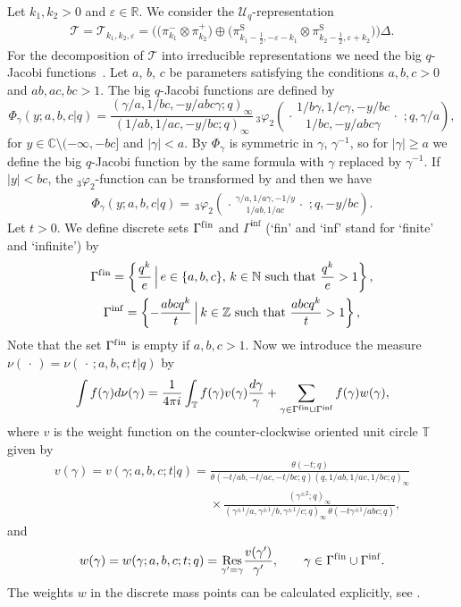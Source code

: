 \documentclass[11pt]{article}
\numberwithin{equation}{section}
\numberwithin{theorem}{section}
\numberwithin{proposition}{section}
\numberwithin{lemma}{section}
\numberwithin{corollary}{section}
\numberwithin{definition}{section}
\numberwithin{example}{section}
\numberwithin{remark}{section}
\numberwithin{note}{section}
\newcommand{\N}{\mathbb N}
\newcommand{\C}{\mathbb C}
\newcommand{\Z}{\mathbb Z}
\newcommand{\T}{\mathbb T}
\newcommand{\eps}{\varepsilon}
\newcommand{\rphis}[5]{\,_{#1}\varphi_{#2} \left( \genfrac{.}{.}{0pt}{}{#3}{#4}
\ ;#5 \right)}
\newcommand{\U}{\mathcal U}
\newcommand{\Res}[1]{\underset{#1}{\mathrm{Res}}}
\begin{document}
Let $k_1,k_2>0$ and $\eps \in \mathbb R$. We consider the $\U_q$-representation
\begin{gather} \label{eq:defT1}
\mathcal T = \mathcal T_{k_1,k_2,\eps}= \Big(\big( \pi_{k_1}^- \otimes \pi_{k_2}^+\big) \oplus \big(\pi^{\mathrm S}_{k_1-\frac12,-\eps-k_1}  \otimes \pi_{k_2-\frac12,\eps+k_2}^{\mathrm S}\big)\Big)  \Delta.
\end{gather}
For the decomposition of $\mathcal T$ into irreducible representations we need the big $q$-Jacobi functions~\cite{KS03}. Let $a$, $b$, $c$ be parameters satisfying the conditions $a,b,c>0$ and $ab,ac,bc>1$. The big $q$-Jacobi functions are def\/ined by
\[
\Phi_\gamma(y;a,b,c|q)= \frac{ (\gamma/a, 1/bc, -y/abc\gamma;q)_\infty} { (1/ab, 1/ac, -y/bc;q)_\infty} \rphis{3}{2}{ 1/b\gamma, 1/c\gamma, -y/bc}{1/bc, -y/abc\gamma}{q, \gamma/a},
\]
for $y \in \C\setminus(-\infty, -bc]$ and $|\gamma|< a$. By \cite[(III.9)]{GRa04} $\Phi_\gamma$ is symmetric in $\gamma$, $\gamma^{-1}$, so for $|\gamma|\geq a$ we def\/ine the big $q$-Jacobi function by the same formula with $\gamma$ replaced by $\gamma^{-1}$. If $|y|<bc$, the $_3\varphi_2$-function can be transformed by \cite[(III.10)]{GRa04} and then we have
\begin{gather} \label{eq:3phi2}
\Phi_\gamma(y;a,b,c|q)= \rphis{3}{2}{\gamma/a, 1/a\gamma, -1/y}{1/ab, 1/ac}{q,-y/bc}.
\end{gather}
Let $t>0$. We def\/ine discrete sets $\Gamma^{\mathrm{f\/in}}$ and $\Gamma^{\mathrm{inf}}$ (`f\/in' and `inf' stand for `f\/inite' and `inf\/inite') by
\begin{gather*}
\Gamma^{\mathrm{f\/in}}=  \left\{ \frac{q^k}{e}\, \Big| \, e \in \{a,b,c\},\, k \in \N \text{ such that } \frac{q^k}{e}>1 \right\},\\
\Gamma^{\mathrm{inf}} = \left\{ -\frac{ abcq^k }{t}\, \Big| \, k \in \Z \text{ such that } \frac{abcq^k}{t}>1 \right\},
\end{gather*}
Note that the set $\Gamma^{\mathrm{f\/in}}$ is empty if $a,b,c>1$.
Now we introduce the measure $\nu(\,\cdot\,)=\nu(\,\cdot\,;a,b,c;t|q)$ by
\[
\int f(\gamma) d\nu(\gamma) = \frac1{4\pi i}\int_\T f(\gamma) v(\gamma) \frac{ d\gamma}{\gamma} + \sum_{\gamma \in \Gamma^{\mathrm{f\/in}} \cup \Gamma^{\mathrm{inf}}} f(\gamma)w(\gamma) ,
\]
where $v$ is the weight function on the counter-clockwise oriented unit circle $\T$ given by
\begin{gather*}
v(\gamma)=v(\gamma;a,b,c;t|q) =  \frac{ \theta(-t;q) }{\theta(-t/ab, -t/ac, -t/bc;q) (q,1/ab,1/ac,1/bc;q)_\infty}\nonumber\\
\phantom{v(\gamma)=v(\gamma;a,b,c;t|q) =}{}  \times \frac{ (\gamma^{\pm 2};q)_\infty }{ (\gamma^{\pm 1}/a, \gamma^{\pm 1}/b, \gamma^{\pm 1}/c;q)_\infty\, \theta(-t\gamma^{\pm 1}/abc;q)},%
\end{gather*}
and{\samepage
\[
w(\gamma)=w(\gamma;a,b,c;t;q) = \Res{\gamma'= \gamma} \frac{ v(\gamma') }{\gamma'}, \qquad \gamma \in \Gamma^{\mathrm{f\/in}} \cup \Gamma^{\mathrm{inf}}.
\]
The weights $w$ in the discrete mass points can be calculated explicitly, see \cite[Section~8]{KS03}.}
\end{document}
